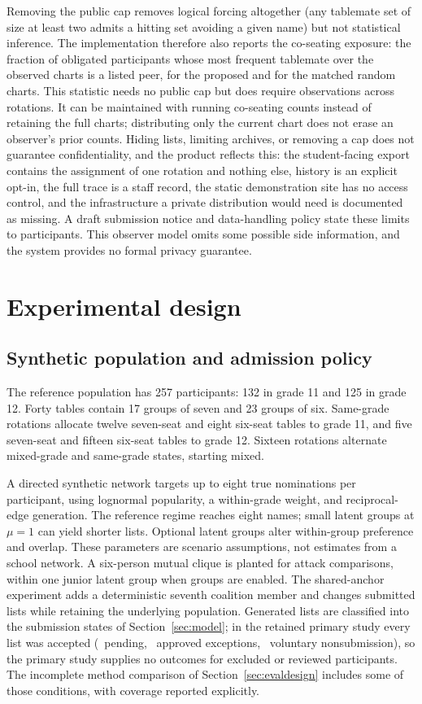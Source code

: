 \documentclass[11pt,a4paper]{article}
\theoremstyle{definition}\newtheorem{definition}[theorem]{Definition}
\theoremstyle{remark}\newtheorem{remark}[theorem]{Remark}
\begin{document}
Removing the public cap removes logical forcing altogether (any tablemate set of size at least two admits a hitting set avoiding a given name) but not statistical inference. The implementation therefore also reports the co-seating exposure: the fraction of obligated participants whose most frequent tablemate over the observed charts is a listed peer, for the proposed and for the matched random charts. This statistic needs no public cap but does require observations across rotations. It can be maintained with running co-seating counts instead of retaining the full charts; distributing only the current chart does not erase an observer's prior counts. Hiding lists, limiting archives, or removing a cap does not guarantee confidentiality, and the product reflects this: the student-facing export contains the assignment of one rotation and nothing else, history is an explicit opt-in, the full trace is a staff record, the static demonstration site has no access control, and the infrastructure a private distribution would need is documented as missing. A draft submission notice and data-handling policy state these limits to participants. This observer model omits some possible side information, and the system provides no formal privacy guarantee.

\section{Experimental design}\label{sec:design}
\subsection{Synthetic population and admission policy}
The reference population has 257 participants: 132 in grade 11 and 125 in grade 12. Forty tables contain 17 groups of seven and 23 groups of six. Same-grade rotations allocate twelve seven-seat and eight six-seat tables to grade 11, and five seven-seat and fifteen six-seat tables to grade 12. Sixteen rotations alternate mixed-grade and same-grade states, starting mixed.

A directed synthetic network targets up to eight true nominations per participant, using lognormal popularity, a within-grade weight, and reciprocal-edge generation. The reference regime reaches eight names; small latent groups at $\mu=1$ can yield shorter lists. Optional latent groups alter within-group preference and overlap. These parameters are scenario assumptions, not estimates from a school network. A six-person mutual clique is planted for attack comparisons, within one junior latent group when groups are enabled. The shared-anchor experiment adds a deterministic seventh coalition member and changes submitted lists while retaining the underlying population. Generated lists are classified into the submission states of Section~\ref{sec:model}; in the retained primary study every list was accepted (\PendingReview\ pending, \ApprovedExceptions\ approved exceptions, \VoluntaryNonsubmission\ voluntary nonsubmission), so the primary study supplies no outcomes for excluded or reviewed participants. The incomplete method comparison of Section~\ref{sec:evaldesign} includes some of those conditions, with coverage reported explicitly.

\end{document}
